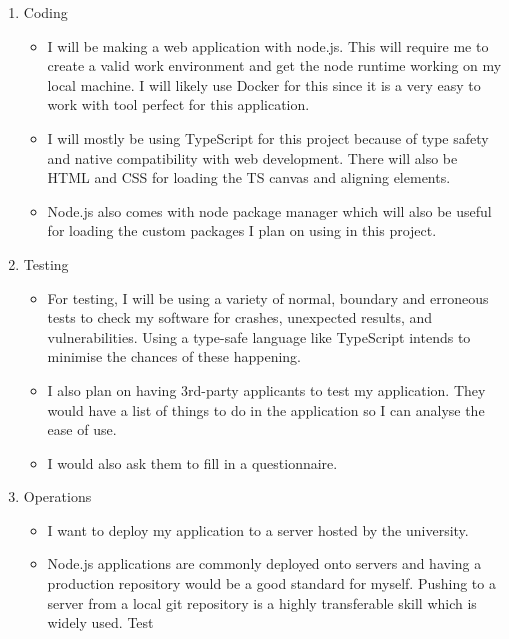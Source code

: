 \documentclass{report}
\begin{document}
\begin{enumerate}
\begin{itemize}
        \end{itemize}
        \item Coding
        \begin{itemize}
            \item I will be making a web application with node.js. This will require me to create a valid work environment and get the node runtime working on my local machine. I will likely use Docker for this since it is a very easy to work with tool perfect for this application.
            \item I will mostly be using TypeScript for this project because of type safety and native compatibility with web development. There will also be HTML and CSS for loading the TS canvas and aligning elements.
            \item Node.js also comes with node package manager which will also be useful for loading the custom packages I plan on using in this project.
        \end{itemize}
        \item Testing
        \begin{itemize}
            \item For testing, I will be using a variety of normal, boundary and erroneous tests to check my software for crashes, unexpected results, and vulnerabilities. Using a type-safe language like TypeScript intends to minimise the chances of these happening.
            \item I also plan on having 3rd-party applicants to test my application. They would have a list of things to do in the application so I can analyse the ease of use.
            \item I would also ask them to fill in a questionnaire.
        \end{itemize}
        \item Operations
        \begin{itemize}
            \item I want to deploy my application to a server hosted by the university.
            \item Node.js applications are commonly deployed onto servers and having a production repository would be a good standard for myself. Pushing to a server from a local git repository is a highly transferable skill which is widely used. Test
        \end{itemize}
    \end{enumerate}
\end{document}
